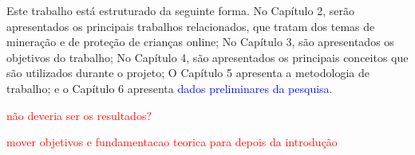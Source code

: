 


Este trabalho está estruturado da seguinte forma. No Capítulo 2, serão apresentados os principais trabalhos relacionados, que tratam dos temas de mineração e de proteção de crianças online; No Capítulo 3, são apresentados os objetivos do trabalho; No Capítulo 4, são apresentados os principais conceitos que são utilizados durante o projeto; O Capítulo 5 apresenta a metodologia de trabalho; e o Capítulo 6 apresenta \textcolor{blue}{dados preliminares da pesquisa.}

\textcolor{red}{não deveria ser os resultados?}

\textcolor{red}{mover objetivos e fundamentacao teorica para depois da introdução}
